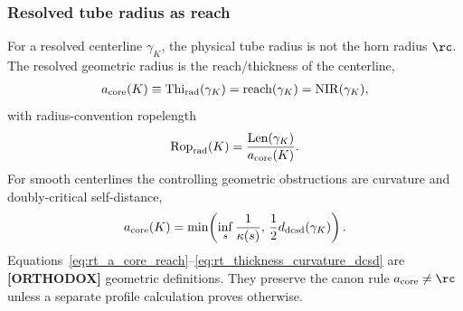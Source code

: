 \subsubsection{Resolved tube radius as reach}
For a resolved centerline $\gamma_K$, the physical tube radius is not the horn
radius $\rc$.  The resolved geometric radius is the reach/thickness of the
centerline,
\begin{align}
    a_{\rm core}(K)
    \equiv
    \operatorname{Thi}_{\rm rad}(\gamma_K)
    =
    \operatorname{reach}(\gamma_K)
    =
    \operatorname{NIR}(\gamma_K),
    \label{eq:rt_a_core_reach}
\end{align}
with radius-convention ropelength
\begin{align}
    \operatorname{Rop}_{\rm rad}(K)
    =
    \frac{\operatorname{Len}(\gamma_K)}{a_{\rm core}(K)}.
    \label{eq:rt_rop_radius_convention}
\end{align}
For smooth centerlines the controlling geometric obstructions are curvature
and doubly-critical self-distance,
\begin{align}
    a_{\rm core}(K)
    =
    \min\!\left(
        \inf_s\frac{1}{\kappa(s)},\,
        \frac12 d_{\rm dcsd}(\gamma_K)
    \right).
    \label{eq:rt_thickness_curvature_dcsd}
\end{align}
Equations~\eqref{eq:rt_a_core_reach}--\eqref{eq:rt_thickness_curvature_dcsd}
are \textbf{[ORTHODOX]} geometric definitions.  They preserve the canon rule
$a_{\rm core}\neq\rc$ unless a separate profile calculation proves otherwise.

